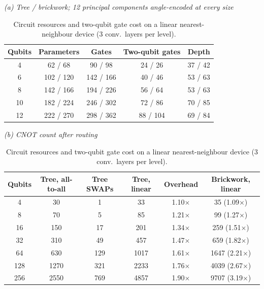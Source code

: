 \begin{table}[tbp]
\centering
\caption{Circuit resources and two-qubit gate cost on a linear nearest-neighbour device (3 conv.\ layers per level).}
\label{tab:main_resources}
\small

{\itshape (a) Tree / brickwork; 12 principal components angle-encoded at every size}\par\smallskip
\begin{tabular}{ccccc}
\toprule
Qubits & Parameters & Gates & Two-qubit gates & Depth \\
\midrule
\num{4} & \num{62} / \num{68} & \num{90} / \num{98} & \num{24} / \num{26} & \num{37} / \num{42} \\
\num{6} & \num{102} / \num{120} & \num{142} / \num{166} & \num{40} / \num{46} & \num{53} / \num{63} \\
\num{8} & \num{142} / \num{166} & \num{194} / \num{226} & \num{56} / \num{64} & \num{53} / \num{63} \\
\num{10} & \num{182} / \num{224} & \num{246} / \num{302} & \num{72} / \num{86} & \num{70} / \num{85} \\
\num{12} & \num{222} / \num{270} & \num{298} / \num{362} & \num{88} / \num{104} & \num{69} / \num{84} \\
\bottomrule
\end{tabular}
\par\smallskip
{\itshape (b) CNOT count after routing}\par\smallskip
\begin{tabular}{cccccc}
\toprule
Qubits & Tree, all-to-all & Tree SWAPs & Tree, linear & Overhead & Brickwork, linear \\
\midrule
\num{4} & \num{30} & \num{1} & \num{33} & \num{1.10}$\times$ & \num{35} (\num{1.09}$\times$) \\
\num{8} & \num{70} & \num{5} & \num{85} & \num{1.21}$\times$ & \num{99} (\num{1.27}$\times$) \\
\num{16} & \num{150} & \num{17} & \num{201} & \num{1.34}$\times$ & \num{259} (\num{1.51}$\times$) \\
\num{32} & \num{310} & \num{49} & \num{457} & \num{1.47}$\times$ & \num{659} (\num{1.82}$\times$) \\
\num{64} & \num{630} & \num{129} & \num{1017} & \num{1.61}$\times$ & \num{1647} (\num{2.21}$\times$) \\
\num{128} & \num{1270} & \num{321} & \num{2233} & \num{1.76}$\times$ & \num{4039} (\num{2.67}$\times$) \\
\num{256} & \num{2550} & \num{769} & \num{4857} & \num{1.90}$\times$ & \num{9707} (\num{3.19}$\times$) \\
\bottomrule
\end{tabular}
\par{}
\end{table}
